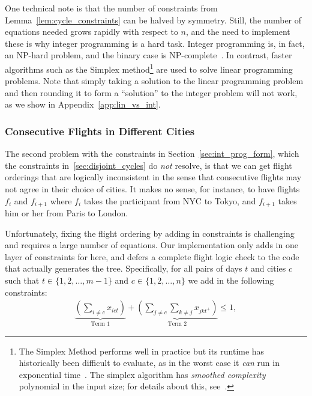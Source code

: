 \documentclass{article}
\begin{document}
One technical note is that the number of constraints from Lemma~\ref{lem:cycle_constraints} can be halved by symmetry. Still, the number of equations
needed grows rapidly with respect to $n$, and the need to implement these is why integer programming is a hard task. Integer programming is, in fact,
an NP-hard problem, and the binary case is NP-complete~\cite{Kar72}. In contrast, faster algorithms such as the Simplex method\footnote{The Simplex
Method performs well in practice but its runtime has historically been difficult to evaluate, as in the worst case it \emph{can} run in exponential
time~\cite{Klee1972}. The simplex algorithm has \emph{smoothed complexity} polynomial in the input size; for details about this,
see~\cite{Spielman:2004:SAA:990308.990310}.} are used to solve linear programming problems. Note that simply taking a solution to the linear
programming problem and then rounding it to form a ``solution'' to the integer problem will not work, as we show in Appendix~\ref{app:lin_vs_int}.

\subsubsection{Consecutive Flights in Different Cities}

The second problem with the constraints in Section~\ref{sec:int_prog_form}, which the constraints in~\ref{sec:disjoint_cycles} do \emph{not} resolve,
is that we can get flight orderings that are logically inconsistent in the sense that consecutive flights may not agree in their choice of cities. It
makes no sense, for instance, to have flights $f_i$ and $f_{i+1}$ where $f_i$ takes the participant from NYC to Tokyo, and $f_{i+1}$ takes him or her
from Paris to London.

Unfortunately, fixing the flight ordering by adding in constraints is challenging and requires a large number of equations. Our implementation only
adds in one layer of constraints for here, and defers a complete flight logic check to the code that actually generates the tree. Specifically, for
all pairs of days $t$ and cities $c$ such that $t \in \{1,2,\ldots, m-1\}$ and $c \in \{1,2,\ldots,n\}$ we add in the following constraints:
\begin{align}
\underbrace{\left(\sum_{i\ne c} x_{ict} \right)}_{\text{Term 1}} + \underbrace{\left( \sum_{j\ne c}\sum_{k\ne j} x_{jkt^+}\right)}_{\text{Term 2}} \le 1,
\end{align}
\end{document}
